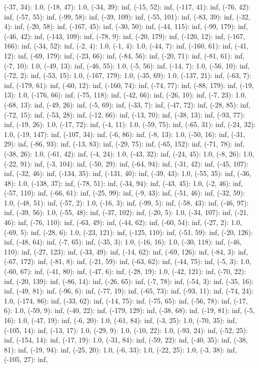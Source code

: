 \documentclass[parskip=half]{scrartcl}
\begin{document}
(-37, 34): 1.0, (-18, 47): 1.0, (-34, 39): inf, (-15, 52): inf, (-117, 41): inf, (-76, 42): inf, (-57, 55): inf, (-99, 58): inf, (-39, 109): inf, (-55, 101): inf, (-83, 39): inf, (-32, 4): inf, (-20, 58): inf, (-167, 45): inf, (-30, 50): inf, (-44, 115): inf, (-99, 179): inf, (-46, 42): inf, (-143, 109): inf, (-78, 9): inf, (-20, 179): inf, (-120, 12): inf, (-167, 166): inf, (-34, 52): inf, (-2, 4): 1.0, (-1, 4): 1.0, (-44, 7): inf, (-160, 61): inf, (-41, 12): inf, (-69, 179): inf, (-23, 66): inf, (-84, 56): inf, (-20, 71): inf, (-81, 61): inf, (-7, 10): 1.0, (-49, 13): inf, (-46, 55): 1.0, (-5, 56): inf, (-14, 7): 1.0, (-56, 10): inf, (-72, 2): inf, (-53, 15): 1.0, (-167, 179): 1.0, (-35, 69): 1.0, (-137, 21): inf, (-63, 7): inf, (-179, 61): inf, (-60, 12): inf, (-160, 74): inf, (-74, 77): inf, (-88, 179): inf, (-19, 13): 1.0, (-176, 66): inf, (-75, 118): inf, (-42, 66): inf, (-26, 10): inf, (-7, 23): 1.0, (-68, 13): inf, (-49, 26): inf, (-5, 69): inf, (-33, 7): inf, (-47, 72): inf, (-28, 85): inf, (-72, 15): inf, (-53, 28): inf, (-12, 66): inf, (-13, 70): inf, (-38, 13): inf, (-93, 77): inf, (-19, 26): 1.0, (-17, 72): inf, (-4, 11): 1.0, (-59, 75): inf, (-65, 31): inf, (-24, 32): 1.0, (-19, 147): inf, (-107, 34): inf, (-6, 86): inf, (-8, 13): 1.0, (-50, 16): inf, (-31, 29): inf, (-86, 93): inf, (-13, 83): inf, (-29, 75): inf, (-65, 152): inf, (-71, 78): inf, (-38, 26): 1.0, (-61, 42): inf, (-4, 24): 1.0, (-43, 32): inf, (-24, 45): 1.0, (-8, 26): 1.0, (-22, 91): inf, (-3, 104): inf, (-50, 29): inf, (-64, 94): inf, (-31, 42): inf, (-45, 107): inf, (-32, 46): inf, (-134, 35): inf, (-131, 40): inf, (-39, 43): 1.0, (-55, 35): inf, (-36, 48): 1.0, (-138, 37): inf, (-78, 51): inf, (-34, 94): inf, (-43, 45): 1.0, (-2, 46): inf, (-57, 110): inf, (-66, 61): inf, (-25, 99): inf, (-9, 43): inf, (-51, 46): inf, (-32, 59): 1.0, (-48, 51): inf, (-57, 2): 1.0, (-16, 3): inf, (-99, 5): inf, (-58, 43): inf, (-46, 97): inf, (-39, 56): 1.0, (-55, 48): inf, (-37, 102): inf, (-20, 5): 1.0, (-34, 107): inf, (-21, 46): inf, (-76, 110): inf, (-63, 49): inf, (-44, 62): inf, (-60, 54): inf, (-27, 2): 1.0, (-69, 5): inf, (-28, 6): 1.0, (-23, 121): inf, (-125, 110): inf, (-51, 59): inf, (-20, 126): inf, (-48, 64): inf, (-7, 65): inf, (-35, 3): 1.0, (-16, 16): 1.0, (-30, 118): inf, (-46, 110): inf, (-27, 123): inf, (-33, 49): inf, (-14, 62): inf, (-69, 126): inf, (-84, 3): inf, (-67, 172): inf, (-81, 8): inf, (-21, 59): inf, (-63, 62): inf, (-44, 75): inf, (-5, 3): 1.0, (-60, 67): inf, (-41, 80): inf, (-47, 6): inf, (-28, 19): 1.0, (-42, 121): inf, (-70, 22): inf, (-20, 139): inf, (-86, 14): inf, (-26, 65): inf, (-7, 78): inf, (-54, 3): inf, (-35, 16): inf, (-49, 81): inf, (-96, 6): inf, (-77, 19): inf, (-65, 73): inf, (-93, 11): inf, (-74, 24): 1.0, (-174, 86): inf, (-33, 62): inf, (-14, 75): inf, (-75, 65): inf, (-56, 78): inf, (-17, 6): 1.0, (-59, 9): inf, (-40, 22): inf, (-179, 129): inf, (-38, 68): inf, (-19, 81): inf, (-5, 16): 1.0, (-47, 19): inf, (-6, 20): 1.0, (-61, 84): inf, (-3, 25): 1.0, (-70, 35): inf, (-105, 14): inf, (-13, 17): 1.0, (-29, 9): 1.0, (-10, 22): 1.0, (-93, 24): inf, (-52, 25): inf, (-154, 14): inf, (-17, 19): 1.0, (-31, 84): inf, (-59, 22): inf, (-40, 35): inf, (-38, 81): inf, (-19, 94): inf, (-25, 20): 1.0, (-6, 33): 1.0, (-22, 25): 1.0, (-3, 38): inf, (-105, 27): inf, 
\end{document}
